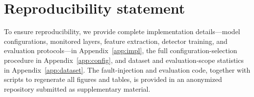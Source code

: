 \section*{Reproducibility statement}

To ensure reproducibility, we provide complete implementation details---model configurations, monitored layers, feature extraction, detector training, and evaluation protocols---in Appendix~\ref{app:impl}, the full configuration-selection procedure in Appendix~\ref{app:config}, and dataset and evaluation-scope statistics in Appendix~\ref{app:dataset}. The fault-injection and evaluation code, together with scripts to regenerate all figures and tables, is provided in an anonymized repository submitted as supplementary material.


